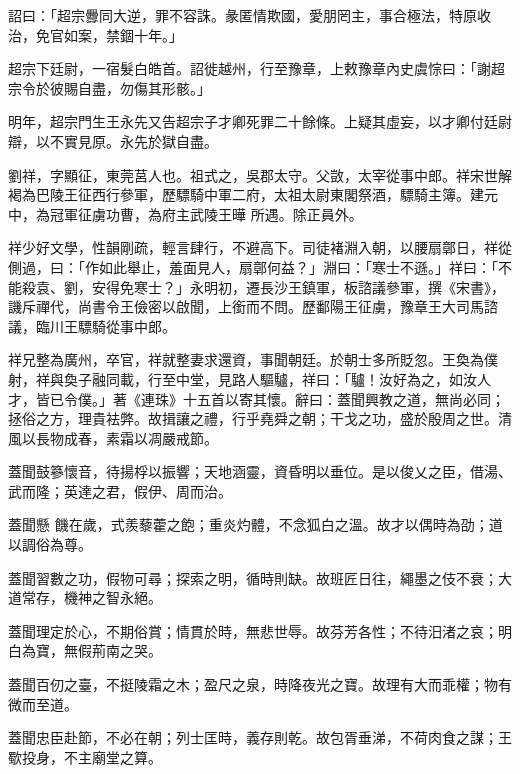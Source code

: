 \begin{pinyinscope}
 詔曰：「超宗釁同大逆，罪不容誅。彖匿情欺國，愛朋罔主，事合極法，特原收治，免官如案，禁錮十年。」



 超宗下廷尉，一宿髮白皓首。詔徙越州，行至豫章，上敕豫章內史虞悰曰：「謝超宗令於彼賜自盡，勿傷其形骸。」



 明年，超宗門生王永先又告超宗子才卿死罪二十餘條。上疑其虛妄，以才卿付廷尉辯，以不實見原。永先於獄自盡。



 劉祥，字顯征，東莞莒人也。祖式之，吳郡太守。父敳，太宰從事中郎。祥宋世解褐為巴陵王征西行參軍，歷驃騎中軍二府，太祖太尉東閣祭酒，驃騎主簿。建元中，為冠軍征虜功曹，為府主武陵王曄
 所遇。除正員外。



 祥少好文學，性韻剛疏，輕言肆行，不避高下。司徒褚淵入朝，以腰扇鄣日，祥從側過，曰：「作如此舉止，羞面見人，扇鄣何益？」淵曰：「寒士不遜。」祥曰：「不能殺袁、劉，安得免寒士？」永明初，遷長沙王鎮軍，板諮議參軍，撰《宋書》，譏斥禪代，尚書令王儉密以啟聞，上銜而不問。歷鄱陽王征虜，豫章王大司馬諮議，臨川王驃騎從事中郎。



 祥兄整為廣州，卒官，祥就整妻求還資，事聞朝廷。於朝士多所貶忽。王奐為僕射，祥與奐子融同載，行至中堂，見路人驅驢，祥曰：「驢！汝好為之，如汝人才，皆已令僕。」著《連珠》十五首以寄其懷。辭曰：蓋聞興教之道，無尚必同；拯俗之方，理貴袪弊。故揖讓之禮，行乎堯舜之朝；干戈之功，盛於殷周之世。清風以長物成春，素霜以凋嚴戒節。



 蓋聞鼓篸懷音，待揚桴以振響；天地涵靈，資昏明以垂位。是以俊乂之臣，借湯、武而隆；英達之君，假伊、周而治。



 蓋聞懸
 饑在歲，式羨藜藿之飽；重炎灼體，不念狐白之溫。故才以偶時為劭；道以調俗為尊。



 蓋聞習數之功，假物可尋；探索之明，循時則缺。故班匠日往，繩墨之伎不衰；大道常存，機神之智永絕。



 蓋聞理定於心，不期俗賞；情貫於時，無悲世辱。故芬芳各性；不待汨渚之哀；明白為寶，無假荊南之哭。



 蓋聞百仞之臺，不挺陵霜之木；盈尺之泉，時降夜光之寶。故理有大而乖權；物有微而至道。



 蓋聞忠臣赴節，不必在朝；列士匡時，義存則乾。故包胥垂涕，不荷肉食之謀；王歜投身，不主廟堂之算。




\end{pinyinscope}
